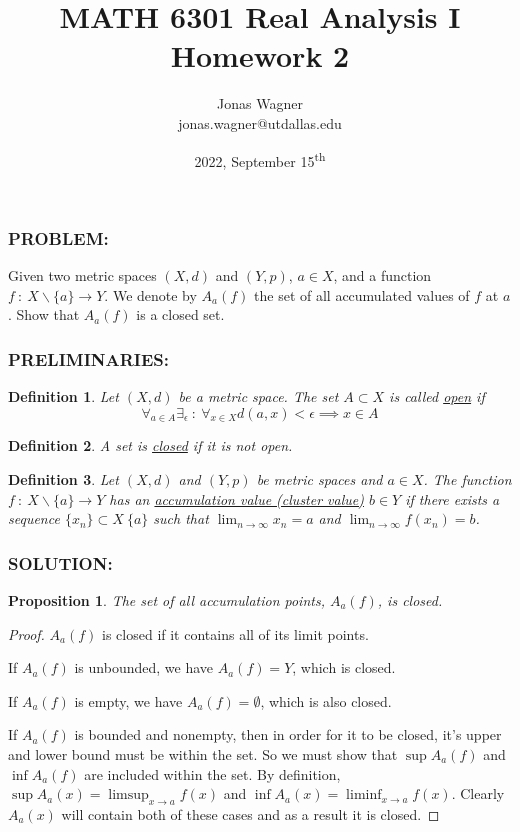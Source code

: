 \documentclass[]{article}
\title{MATH 6301 Real Analysis I \\ Homework 2}
\author{Jonas Wagner\\ jonas.wagner@utdallas.edu}
\date{2022, September 15\textsuperscript{th}}
\newcommand{\Problem}{\subsubsection*{\textbf{PROBLEM:}}}
\newcommand{\Solution}{\subsubsection*{\textbf{SOLUTION:}}}
\newcommand{\Preliminaries}{\subsubsection*{\textbf{PRELIMINARIES:}}}
\newcommand{\st}{\ : \ }
\newtheorem{definition}{Definition}
\newtheorem{proposition}{Proposition}
\begin{document}
\maketitle

\tableofcontents



\newpage
\section{}
\Problem
Given two metric spaces $(X,d)$ and $(Y,p)$, $a \in X$, and a function $f \st X \backslash \{a\} \to Y$.
We denote by $A_a(f)$ the set of all accumulated values of $f$ at $a$.
Show that $A_a(f)$ is a closed set.

\Preliminaries
\begin{definition}
    Let $(X,d)$ be a metric space.
    The set $A \subset X$ is called \emph{\underline{open}} if \[
        \forall_{a \in A} \exists_{\epsilon} \st \forall_{x \in X} d(a,x) < \epsilon \implies x \in A
    \]
\end{definition}
\begin{definition}
    A set is \emph{\underline{closed}} if it is not open.
\end{definition}
\begin{definition}
    Let $(X,d)$ and $(Y,p)$ be metric spaces and $a \in X$. 
    The function $f \st X \backslash \{a\} \to Y$ has an \underline{\emph{accumulation value (cluster value)}} $b \in Y$ if there exists a sequence $\{x_n\} \subset X \ \{a\}$ such that $\lim_{n \to \infty} x_n = a$ and $\lim_{n\to\infty} f(x_n) = b$.
\end{definition}

\Solution
\begin{proposition}
    The set of all accumulation points, $A_a(f)$, is closed.
\end{proposition}
\begin{proof}
    $A_a(f)$ is closed if it contains all of its limit points.

    If $A_a(f)$ is unbounded, we have $A_a(f) = Y$, which is closed.

    If $A_a(f)$ is empty, we have $A_a(f) = \emptyset$, which is also closed.

    If $A_a(f)$ is bounded and nonempty, then in order for it to be closed, it's upper and lower bound must be within the set.
    So we must show that $\sup A_a(f)$ and $\inf A_a(f)$ are included within the set.
    By definition, $\sup A_a(x) = \limsup_{x \to a} f(x)$ and $\inf A_a(x) = \liminf_{x \to a} f(x)$.
    Clearly $A_a(x)$ will contain both of these cases and as a result it is closed.
\end{proof}
\end{document}
